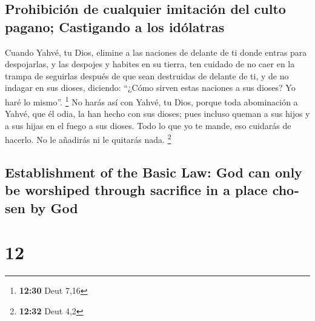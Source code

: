 \begin{paracol}{2}
\hypertarget{prohibiciuxf3n-de-cualquier-imitaciuxf3n-del-culto-pagano-castigando-a-los-iduxf3latras}{%
\subsection{Prohibición de cualquier imitación del culto pagano;
Castigando a los
idólatras}\label{prohibiciuxf3n-de-cualquier-imitaciuxf3n-del-culto-pagano-castigando-a-los-iduxf3latras}}

 Cuando Yahvé, tu Dios, elimine a las naciones de delante
de ti donde entras para despojarlas, y las despojes y habites en su
tierra,  ten cuidado de no caer en la trampa de seguirlas
después de que sean destruidas de delante de ti, y de no indagar en sus
dioses, diciendo: ``¿Cómo sirven estas naciones a sus dioses? Yo haré lo
mismo''. \footnote{\textbf{12:30} Deut 7,16}  No harás
así con Yahvé, tu Dios, porque toda abominación a Yahvé, que él odia, la
han hecho con sus dioses; pues incluso queman a sus hijos y a sus hijas
en el fuego a sus dioses.  Todo lo que yo te mande, eso
cuidarás de hacerlo. No le añadirás ni le quitarás nada. \footnote{\textbf{12:32}
  Deut 4,2}

\switchcolumn
\begin{otherlanguage}{english}

\hypertarget{establishment-of-the-basic-law-god-can-only-be-worshiped-through-sacrifice-in-a-place-chosen-by-god}{%
\subsection{Establishment of the Basic Law: God can only be worshiped
through sacrifice in a place chosen by
God}\label{establishment-of-the-basic-law-god-can-only-be-worshiped-through-sacrifice-in-a-place-chosen-by-god}}

\hypertarget{section-23}{%
\section{12}\label{section-23}}


\end{otherlanguage}
\end{paracol}
